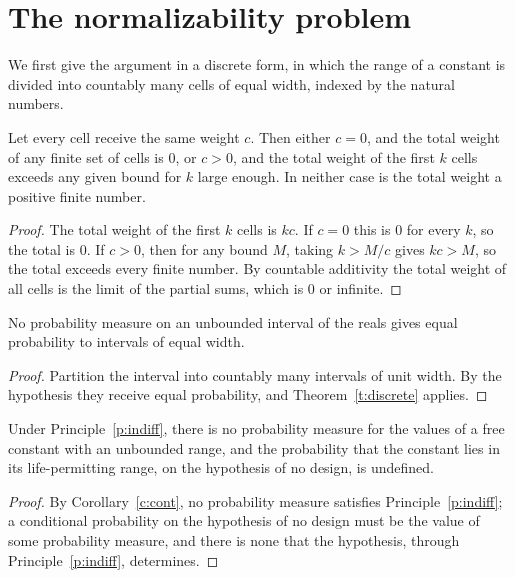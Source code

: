 \documentclass{situationist-preprint}
\begin{document}
\section{The normalizability problem}

We first give the argument in a discrete form, in which the range of a constant is divided into countably many cells of equal width, indexed by the natural numbers.

\begin{theorem}\label{t:discrete}
Let every cell receive the same weight $c$. Then either $c = 0$, and the total weight of any finite set of cells is $0$, or $c > 0$, and the total weight of the first $k$ cells exceeds any given bound for $k$ large enough. In neither case is the total weight a positive finite number.
\end{theorem}

\begin{proof}
The total weight of the first $k$ cells is $kc$. If $c = 0$ this is $0$ for every $k$, so the total is $0$. If $c > 0$, then for any bound $M$, taking $k > M/c$ gives $kc > M$, so the total exceeds every finite number. By countable additivity the total weight of all cells is the limit of the partial sums, which is $0$ or infinite.
\end{proof}

\begin{corollary}\label{c:cont}
No probability measure on an unbounded interval of the reals gives equal probability to intervals of equal width.
\end{corollary}

\begin{proof}
Partition the interval into countably many intervals of unit width. By the hypothesis they receive equal probability, and Theorem~\ref{t:discrete} applies.
\end{proof}

\begin{theorem}\label{t:undefined}
Under Principle~\ref{p:indiff}, there is no probability measure for the values of a free constant with an unbounded range, and the probability that the constant lies in its life-permitting range, on the hypothesis of no design, is undefined.
\end{theorem}

\begin{proof}
By Corollary~\ref{c:cont}, no probability measure satisfies Principle~\ref{p:indiff}; a conditional probability on the hypothesis of no design must be the value of some probability measure, and there is none that the hypothesis, through Principle~\ref{p:indiff}, determines.
\end{proof}
\end{document}
